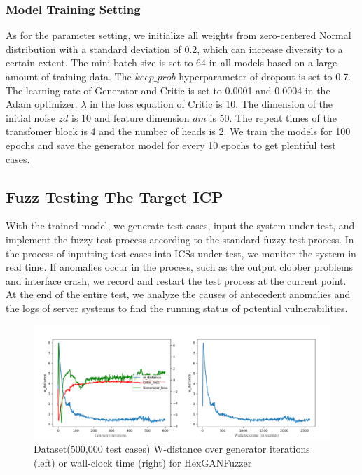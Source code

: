 \subsubsection{Model Training Setting}
As for the parameter setting, we initialize all weights from zero-centered Normal distribution with a standard deviation of 0.2, which can increase diversity to a certain extent. The mini-batch size is set to 64 in all models based on a large amount of training data. The $keep\_prob$ hyperparameter of dropout is set to 0.7. 
The learning rate of Generator and Critic is set to 0.0001 and 0.0004 in the Adam optimizer. 
$\lambda$ in the loss equation of Critic is 10. The dimension of the initial noise $zd$ is 10 and feature dimension $dm$ is 50.
The repeat times of the transfomer block is 4 and the number of heads is 2.
We train the models for 100 epochs and save the generator model for every 10 epochs to get plentiful test cases.


\subsection{Fuzz Testing The Target ICP}
With the trained model, we generate test cases, input the system under test, and implement the fuzzy test process according to the standard fuzzy test process. In the process of inputting test cases into ICSs under test, we monitor the system in real time. If anomalies occur in the process, such as the output clobber problems and interface crash, we record and restart the test process at the current point. At the end of the entire test, we analyze the causes of antecedent anomalies and the logs of server systems to find the running status of potential vulnerabilities.

\begin{figure}[htbp] 		 %
	\centering
	\includegraphics[width=5.5in]{FigModelW-distance.pdf}
	\caption{Dataset(500,000 test cases) W-distance over generator iterations (left) or wall-clock time (right) for HexGANFuzzer}
	\label{FigModelW-distance}
\end{figure} 

